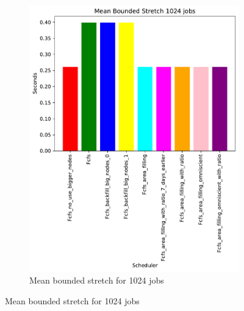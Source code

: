 \documentclass[a4paper]{article}
\begin{document}
\begin{figure}[H]
\begin{subfigure}[b]{0.4\linewidth}\centering\includegraphics[width=0.95\linewidth]{MBSS/plot/Size_Constraint_2022-01-17->2022-01-17_V9532_Mean_Stretch_With_a_Minimum_1024_450_128_32_256_4_1024.pdf}\caption{Mean bounded stretch for 1024 jobs}\label{45}\end{subfigure}

\end{figure}
\end{document}
